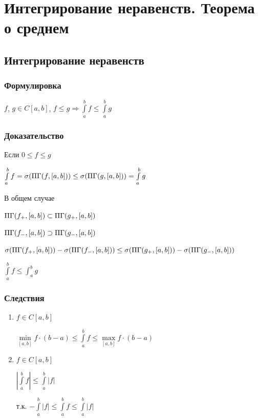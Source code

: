 \documentclass{article}
\begin{document}
	\newpage
	
	\section{Интегрирование неравенств. Теорема о среднем}
	
		\subsection{Интегрирование неравенств}
		
			\subsubsection{Формулировка}
                
                $f$, $g \in C[a, b]$, $f \leq g \Rightarrow \int\limits^b_a f \leq \int\limits^b_a g$
			
            \subsubsection{Доказательство}
            
                Если $0 \leq f \leq g$
			
                $\int\limits^b_a f = \sigma (\Pi\Gamma (f, [a, b])) \leq \sigma (\Pi\Gamma (g, [a, b])) = \int\limits^b_a g$
			
                В общем случае
			
                $\Pi\Gamma(f_+, [a, b]) \subset \Pi\Gamma(g_+, [a, b])$
			
                $\Pi\Gamma(f_-, [a, b]) \supset \Pi\Gamma(g_-, [a, b])$
			
                $\sigma (\Pi\Gamma(f_+, [a, b])) - \sigma (\Pi\Gamma(f_-, [a, b])) \leq \sigma (\Pi\Gamma(g_+, [a, b])) - \sigma (\Pi\Gamma(g_-, [a, b]))$
			
                $\int\limits^b_a f \leq \int^b_a g$
			
			\subsubsection{Следствия}
			
                \begin{enumerate}
                
                    \item $f \in C[a, b]$
                    
                        $\min\limits_{[a, b]} f \cdot (b - a) \leq \int\limits^b_a f \leq \max\limits_{[a, b]} f \cdot (b - a)$
                        
                    \item $f \in C[a, b]$
                    
                        $\left| \int\limits^b_a f \right| \leq \int\limits^b_a \left| f \right|$
                        
                        т.к. $- \int\limits^b_a \left| f \right| \leq \int\limits^b_a f \leq \int\limits^b_a \left| f \right|$
                        
                \end{enumerate}
                
\end{document}
